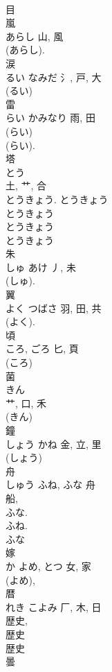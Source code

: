 \documentclass[8pt]{extreport}
\begin{document}
\begin{CJK}{UTF8}{min}
\\	目
\\	嵐	
\\	あらし	山, 風	
\\	(あらし).	
\\	涙	
\\	るい	なみだ	氵, 戸, 大	
\\	(るい) 
\\	雷	
\\	らい	かみなり	雨, 田	
\\	(らい) 
\\	(らい).	
\\	塔	
\\	とう	
\\	土, 艹, 合	
\\	とうきょう. とうきょう 
\\	とうきょう 
\\	とうきょう 
\\	とうきょう 
\\	朱	
\\	しゅ	あけ	丿, 未	
\\	(しゅ). 
\\	翼	
\\	よく	つばさ	羽, 田, 共	
\\	(よく). 
\\	頃	
\\	ころ, ごろ	匕, 頁	
\\	(ころ) 
\\	菌	
\\	きん	
\\	艹, 口, 禾	
\\	(きん) 
\\	鐘	
\\	しょう	かね	金, 立, 里	
\\	(しょう) 
\\	舟	
\\	しゅう	ふね, ふな	舟	
\\	船, 
\\	ふな. 
\\	ふね.	
\\	ふな 
\\	嫁	
\\	か	よめ, とつ	女, 家	
\\	(よめ), 
\\	暦	
\\	れき	こよみ	厂, 木, 日	
\\	歴史, 
\\	歴史
\\	歴史 
\\	曇	

\end{CJK}
\end{document}
